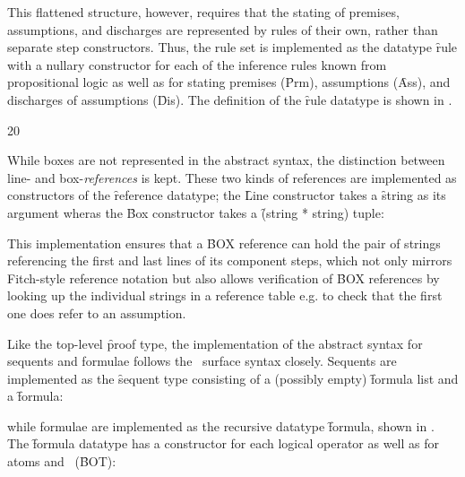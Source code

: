 \documentclass[BA.tex]{subfiles}
\begin{document}
 This flattened structure, however, requires that the stating
 of premises, assumptions, and discharges are represented by rules of their
 own, rather than separate step constructors. Thus, the rule set is 
 implemented as the datatype \f{rule} with a nullary constructor for each
 of the inference rules known from propositional logic as well as for
 stating premises (\f{Prm}), assumptions (\f{Ass}), and discharges of 
 assumptions (\f{Dis}). 
 The definition of the \f{rule} datatype is shown in .

{20}

While boxes are not represented in the abstract syntax, the distinction
 between line- and box-\emph{references} is kept.
 These two kinds of references are implemented as constructors of the 
 \f{reference} datatype; the \f{Line} 
 constructor takes a \f{string} as its argument wheras the \f{Box}
 constructor takes a \f{(string * string)} tuple:

This implementation ensures that a \f{BOX reference} can hold the pair
 of strings referencing the first and last lines of its component steps,
 which not only mirrors Fitch-style reference notation but also allows
 \chk{easy} verification of \f{BOX references} by looking up the individual 
 strings in a reference table e.g. to check that the first one does
 refer to an assumption.

Like the top-level \f{proof} type, the implementation of the abstract syntax
 for sequents and formulae follows the \bp\ surface syntax closely.
 Sequents are implemented as the \f{sequent} 
 type consisting of a (possibly empty) \f{formula list} and a \f{formula}:

 while formulae are implemented as the recursive datatype \f{formula},
 shown in \lst{../Proof.sml38}.
 The \f{formula} datatype has a
 constructor for each logical
 operator as well as for atoms and \abs\ (\f{BOT}):

\end{document}

